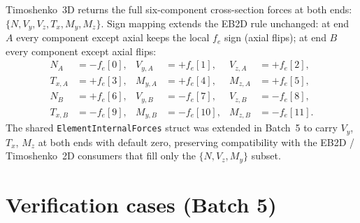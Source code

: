 \documentclass[11pt,a4paper]{book}
\begin{document}
Timoshenko~3D returns the full six-component cross-section forces at both ends: $\{N, V_y, V_z, T_x, M_y, M_z\}$. Sign mapping extends the EB2D rule unchanged: at end $A$ every component except axial keeps the local $f_e$ sign (axial flips); at end $B$ every component except axial flips:
\[
\begin{aligned}
N_A &= -f_e[0],   & V_{y,A} &= +f_e[1],   & V_{z,A} &= +f_e[2], \\
T_{x,A} &= +f_e[3], & M_{y,A} &= +f_e[4], & M_{z,A} &= +f_e[5], \\
N_B &= +f_e[6],   & V_{y,B} &= -f_e[7],   & V_{z,B} &= -f_e[8], \\
T_{x,B} &= -f_e[9], & M_{y,B} &= -f_e[10],& M_{z,B} &= -f_e[11].
\end{aligned}
\]
The shared \texttt{ElementInternalForces} struct was extended in Batch~5 to carry $V_y$, $T_x$, $M_z$ at both ends with default zero, preserving compatibility with the EB2D / Timoshenko~2D consumers that fill only the $\{N, V_z, M_y\}$ subset.

\section{Verification cases (Batch 5)}\label{sec:timo3d-verification}
\end{document}
